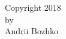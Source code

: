 \newpage
\phantom{Free space for short editorial comments.} \vglue -14pt
\vfill
\begin{center}
  Copyright 2018\\ by\\ Andrii Bozhko
\end{center}
\vfill
\newpage

